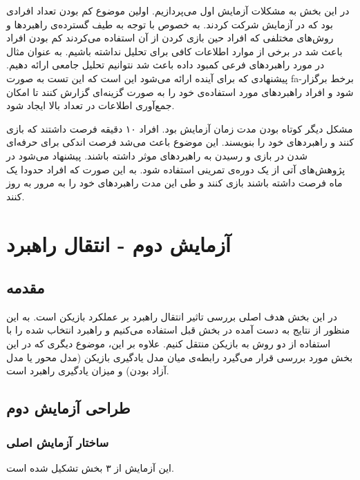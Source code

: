 \documentclass[twoside, a4paper,11pt]{book}
\numberwithin{equation}{chapter}
\numberwithin{table}{chapter}
\numberwithin{figure}{chapter}
\numberwithin{equation}{chapter}
\newcommand{\mls}[1]{\gls{fa-#1}\glsuseri{la-#1}}
\begin{document}
در این بخش به مشکلات آزمایش اول می‌پردازیم. اولین موضوع کم بودن تعداد افرادی بود که در آزمایش شرکت کردند. به خصوص با توجه به طیف گسترده‌ی راهبردها و روش‌های مختلفی که افراد حین بازی کردن از آن استفاده می‌کردند کم بودن افراد باعث شد در برخی از موارد اطلاعات کافی برای تحلیل نداشته باشیم. به عنوان مثال در مورد راهبردهای فرعی کمبود داده باعث شد نتوانیم تحلیل جامعی ارائه دهیم. پیشنهادی که برای آینده ارائه می‌شود این است که این تست به صورت \mls{برخط} برگزار شود و افراد راهبردهای مورد استفاده‌ی خود را به صورت گزینه‌ای گزارش کنند تا امکان جمع‌آوری اطلاعات در تعداد بالا ایجاد شود.

مشکل دیگر کوتاه بودن مدت زمان آزمایش بود. افراد ۱۰ دقیقه فرصت داشتند که بازی کنند و راهبردهای خود را بنویسند. این موضوع باعث می‌شد فرصت اندکی برای حرفه‌ای شدن در بازی و رسیدن به راهبردهای موثر داشته باشند. پیشنهاد می‌شود در پژوهش‌های آتی از یک دوره‌ی تمرینی استفاده شود. به این صورت که افراد حدودا یک ماه فرصت داشته باشند بازی کنند و طی این مدت راهبردهای خود را به مرور به روز کنند.

\chapter{آزمایش دوم - انتقال راهبرد}
\label{chapter:PartTwoTransfer}
\thispagestyle{plain}

\section{مقدمه}
در این بخش هدف اصلی بررسی تاثیر انتقال راهبرد بر عملکرد بازیکن است. به این منظور از نتایج به دست آمده در بخش قبل استفاده می‌کنیم و راهبرد انتخاب شده را با استفاده از دو روش به بازیکن منتقل کنیم. علاوه بر این، موضوع دیگری که در این بخش مورد بررسی قرار می‌گیرد رابطه‌ی میان مدل یادگیری بازیکن (مدل محور یا مدل آزاد بودن) و میزان یادگیری راهبرد است.

\section{طراحی آزمایش دوم}
\subsection{ساختار آزمایش اصلی} \label{partTwoMainTest}

این آزمایش از ۳ بخش تشکیل شده است.
\end{document}

